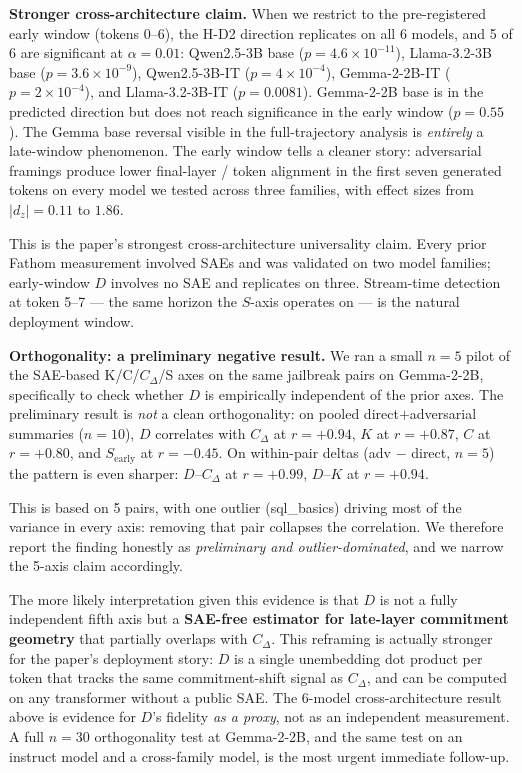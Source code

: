 \documentclass{article}
\begin{document}
\textbf{Stronger cross-architecture claim.} When we restrict to the
pre-registered early window (tokens 0--6), the H-D2 direction
replicates on all 6 models, and 5 of 6 are significant at
$\alpha = 0.01$: Qwen2.5-3B base ($p = 4.6\!\times\!10^{-11}$),
Llama-3.2-3B base ($p = 3.6\!\times\!10^{-9}$), Qwen2.5-3B-IT
($p = 4\!\times\!10^{-4}$), Gemma-2-2B-IT ($p = 2\!\times\!10^{-4}$),
and Llama-3.2-3B-IT ($p = 0.0081$). Gemma-2-2B base is in the
predicted direction but does not reach significance in the early
window ($p = 0.55$). The Gemma base reversal visible in the
full-trajectory analysis is \emph{entirely} a late-window
phenomenon. The early window tells a cleaner story: adversarial
framings produce lower final-layer / token alignment in the first
seven generated tokens on every model we tested across three
families, with effect sizes from $|d_z| = 0.11$ to $1.86$.

This is the paper's strongest cross-architecture universality
claim. Every prior Fathom measurement involved SAEs and was
validated on two model families; early-window $D$ involves no SAE
and replicates on three. Stream-time detection at token 5--7 ---
the same horizon the $S$-axis operates on --- is the natural
deployment window.

\textbf{Orthogonality: a preliminary negative result.} We ran a
small $n=5$ pilot of the SAE-based K/C/$C_\Delta$/S axes on the
same jailbreak pairs on Gemma-2-2B, specifically to check whether
$D$ is empirically independent of the prior axes. The preliminary
result is \emph{not} a clean orthogonality: on pooled
direct$+$adversarial summaries ($n=10$), $D$ correlates with
$C_\Delta$ at $r = +0.94$, $K$ at $r = +0.87$, $C$ at $r = +0.80$,
and $S_\text{early}$ at $r = -0.45$. On within-pair deltas
(adv $-$ direct, $n=5$) the pattern is even sharper:
$D$--$C_\Delta$ at $r = +0.99$, $D$--$K$ at $r = +0.94$.

This is based on 5 pairs, with one outlier (sql\_basics) driving
most of the variance in every axis: removing that pair collapses
the correlation. We therefore report the finding honestly as
\emph{preliminary and outlier-dominated}, and we narrow the
5-axis claim accordingly.

The more likely interpretation given this evidence is that $D$
is not a fully independent fifth axis but a
\textbf{SAE-free estimator for late-layer commitment geometry}
that partially overlaps with $C_\Delta$. This reframing is actually
stronger for the paper's deployment story: $D$ is a single
unembedding dot product per token that tracks the same
commitment-shift signal as $C_\Delta$, and can be computed on any
transformer without a public SAE. The 6-model cross-architecture
result above is evidence for $D$'s fidelity \emph{as a proxy},
not as an independent measurement. A full $n=30$ orthogonality
test at Gemma-2-2B, and the same test on an instruct model and a
cross-family model, is the most urgent immediate follow-up.
\end{document}
